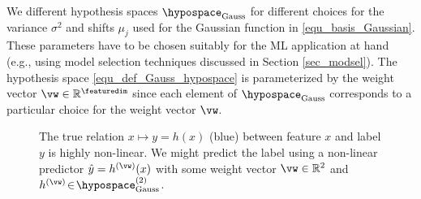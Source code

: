 \documentclass[12pt]{report}
\begin{document}
We different hypothesis spaces $\hypospace_{\rm Gauss}$ for  
different choices for the variance $\sigma^{2}$ and shifts $\mu_{j}$ 
used for the Gaussian function in \eqref{equ_basis_Gaussian}. 
These parameters have to be chosen suitably for the ML application 
at hand (e.g., using model selection techniques discussed in Section \ref{sec_modsel}). 
The hypothesis space \eqref{equ_def_Gauss_hypospace} is parameterized 
by the weight vector $\vw \in \mathbb{R}^{\featuredim}$ since each element 
of $\hypospace_{\rm Gauss}$ corresponds to a particular choice for the weight vector $\vw$. 


\begin{figure}[htbp]
\begin{center}
     \vspace*{-10mm}
\end{center}\caption{The true relation $x \mapsto y=h(x)$ (blue) between feature $x$ and label $y$ is highly non-linear. We might predict 
the label using a non-linear predictor $\hat{y}=h^{(\vw)}(x)$ with some weight vector $\vw \in \mathbb{R}^{2}$ and $h^{(\vw)} \!\in\!\hypospace^{(2)}_{\rm Gauss}$.} 
\label{fig_lin_bas_expansion}
\end{figure}
\end{document}
